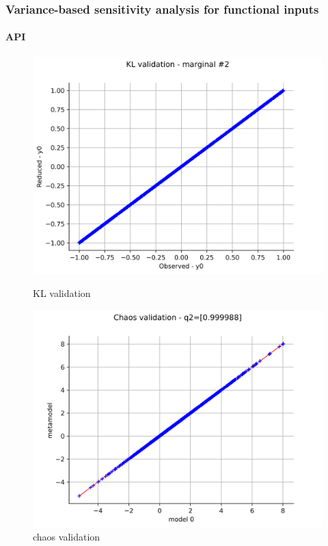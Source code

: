 \documentclass[aspectratio=169]{beamer}
\begin{document}
\begin{frame}[containsverbatim]
\frametitle{Variance-based sensitivity analysis for functional inputs}

\framesubtitle{API}

\begin{figure}[!htb]
  \includegraphics[width=\linewidth]{figures/valid_kl2.png}
  \caption{KL validation}
\endminipage\hfill
{}
  \includegraphics[width=\linewidth]{figures/valid_chaos.png}
  \caption{chaos validation}
\endminipage\hfill
\end{figure}


\end{frame}
\end{document}

